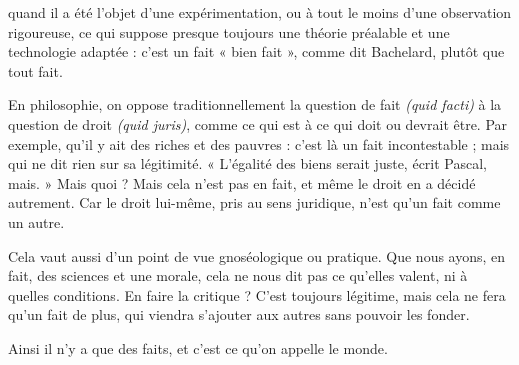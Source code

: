 quand il a été l’objet d’une expérimentation, ou à tout le moins d’une observation
rigoureuse, ce qui suppose presque toujours une théorie préalable et une
technologie adaptée : c’est un fait « bien fait », comme dit Bachelard, plutôt
que tout fait.

En philosophie, on oppose traditionnellement la question de fait {\it (quid
facti)} à la question de droit {\it (quid juris)}, comme ce qui est à ce qui doit ou
devrait être. Par exemple, qu’il y ait des riches et des pauvres : c’est là un fait
incontestable ; mais qui ne dit rien sur sa légitimité. « L'égalité des biens serait
juste, écrit Pascal, mais. » Mais quoi ? Mais cela n’est pas en fait, et même le
droit en a décidé autrement. Car le droit lui-même, pris au sens juridique, n’est
qu’un fait comme un autre.

Cela vaut aussi d’un point de vue gnoséologique ou pratique. Que nous
ayons, en fait, des sciences et une morale, cela ne nous dit pas ce qu’elles valent,
ni à quelles conditions. En faire la critique ? C’est toujours légitime, mais cela
ne fera qu’un fait de plus, qui viendra s'ajouter aux autres sans pouvoir les
fonder.

Ainsi il n’y a que des faits, et c’est ce qu’on appelle le monde.

